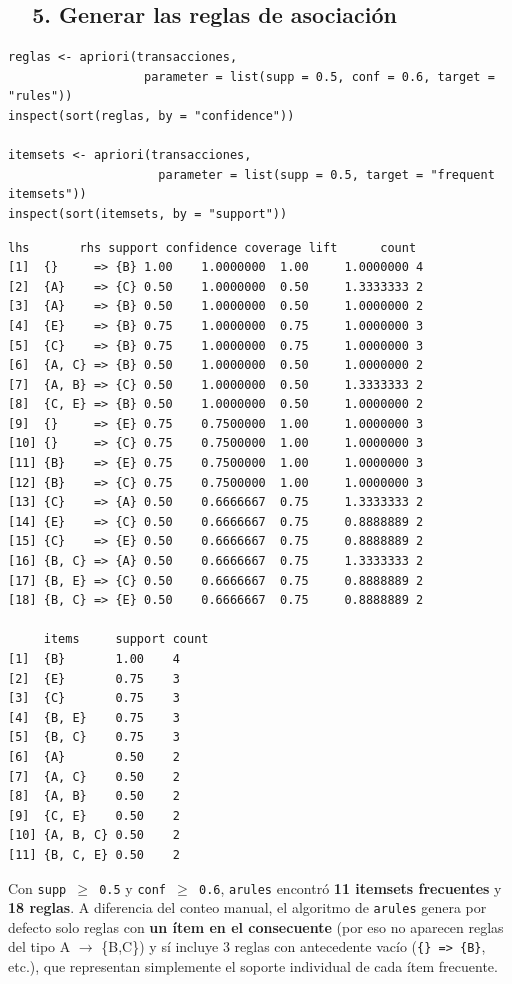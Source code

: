 \documentclass[11pt,a4paper]{article}
\begin{document}
\subsection{\faMagic\ \ 5. Generar las reglas de asociación}
\begin{lstlisting}[style=styleR]
reglas <- apriori(transacciones,
                   parameter = list(supp = 0.5, conf = 0.6, target = "rules"))
inspect(sort(reglas, by = "confidence"))

itemsets <- apriori(transacciones,
                     parameter = list(supp = 0.5, target = "frequent itemsets"))
inspect(sort(itemsets, by = "support"))
\end{lstlisting}
\begin{lstlisting}[style=styleOut]
     lhs       rhs support confidence coverage lift      count
[1]  {}     => {B} 1.00    1.0000000  1.00     1.0000000 4
[2]  {A}    => {C} 0.50    1.0000000  0.50     1.3333333 2
[3]  {A}    => {B} 0.50    1.0000000  0.50     1.0000000 2
[4]  {E}    => {B} 0.75    1.0000000  0.75     1.0000000 3
[5]  {C}    => {B} 0.75    1.0000000  0.75     1.0000000 3
[6]  {A, C} => {B} 0.50    1.0000000  0.50     1.0000000 2
[7]  {A, B} => {C} 0.50    1.0000000  0.50     1.3333333 2
[8]  {C, E} => {B} 0.50    1.0000000  0.50     1.0000000 2
[9]  {}     => {E} 0.75    0.7500000  1.00     1.0000000 3
[10] {}     => {C} 0.75    0.7500000  1.00     1.0000000 3
[11] {B}    => {E} 0.75    0.7500000  1.00     1.0000000 3
[12] {B}    => {C} 0.75    0.7500000  1.00     1.0000000 3
[13] {C}    => {A} 0.50    0.6666667  0.75     1.3333333 2
[14] {E}    => {C} 0.50    0.6666667  0.75     0.8888889 2
[15] {C}    => {E} 0.50    0.6666667  0.75     0.8888889 2
[16] {B, C} => {A} 0.50    0.6666667  0.75     1.3333333 2
[17] {B, E} => {C} 0.50    0.6666667  0.75     0.8888889 2
[18] {B, C} => {E} 0.50    0.6666667  0.75     0.8888889 2

     items     support count
[1]  {B}       1.00    4
[2]  {E}       0.75    3
[3]  {C}       0.75    3
[4]  {B, E}    0.75    3
[5]  {B, C}    0.75    3
[6]  {A}       0.50    2
[7]  {A, C}    0.50    2
[8]  {A, B}    0.50    2
[9]  {C, E}    0.50    2
[10] {A, B, C} 0.50    2
[11] {B, C, E} 0.50    2
\end{lstlisting}
Con \texttt{supp $\geq$ 0.5} y \texttt{conf $\geq$ 0.6}, \texttt{arules} encontró \textbf{11 itemsets frecuentes} y \textbf{18 reglas}. A diferencia del conteo manual, el algoritmo de \texttt{arules} genera por defecto solo reglas con \textbf{un ítem en el consecuente} (por eso no aparecen reglas del tipo A $\to$ \{B,C\}) y sí incluye 3 reglas con antecedente vacío (\texttt{\{\} => \{B\}}, etc.), que representan simplemente el soporte individual de cada ítem frecuente.
\end{document}
